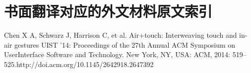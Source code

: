 \section{书面翻译对应的外文材料原文索引}
\begin{translationbib}
\item Chen X A, Schwarz J, Harrison C, et al.  Air+touch: Interweaving touch and in-air gestures UIST ’14: Proceedings of the 27th Annual ACM Symposium on UserInterface Software and Technology. New York, NY, USA: ACM, 2014: 519–525.http://doi.acm.org/10.1145/2642918.2647392
\end{translationbib}
